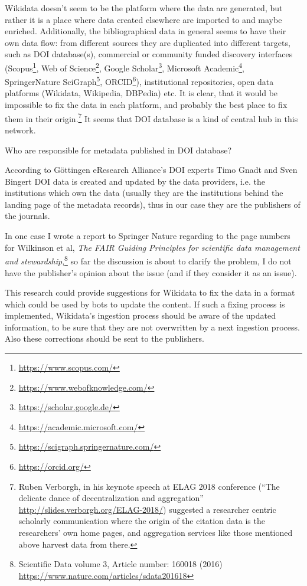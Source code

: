 Wikidata doesn't seem to be the platform where the data are generated, but rather it is a place where data created elsewhere are imported to and maybe enriched. Additionally, the bibliographical data in general seems to have their own data flow: from different sources they are duplicated into different targets, such as DOI database(s), commercial or community funded discovery interfaces (Scopus\footnote{\url{https://www.scopus.com/}}, Web of Science\footnote{\url{https://www.webofknowledge.com/}}, Google Scholar\footnote{\url{https://scholar.google.de/}}, Microsoft Academic\footnote{\url{https://academic.microsoft.com/}}, SpringerNature SciGraph\footnote{\url{https://scigraph.springernature.com/}}, \textsc{ORCID}\footnote{\url{https://orcid.org/}}), institutional repositories, open data platforms (Wikidata, Wikipedia, DBPedia) etc. It is clear, that it would be impossible to fix the data in each platform, and probably the best place to fix them in their origin.\footnote{Ruben Verborgh, in his keynote speech at ELAG 2018 conference (``The delicate dance of decentralization and aggregation'' \url{http://slides.verborgh.org/ELAG-2018/}) suggested a researcher centric scholarly communication where the origin of the citation data is the researchers' own home pages, and aggregation services like those mentioned above harvest data from there.} It seems that DOI database is a kind of central hub in this network.

Who are responsible for metadata published in DOI database?

According to Göttingen eResearch Alliance's DOI experts Timo Gnadt and Sven Bingert DOI data is created and updated by the data providers, i.e. the institutions which own the data (usually they are the institutions behind the landing page of the metadata records), thus in our case they are the publishers of the journals.

In one case I wrote a report to Springer Nature regarding to the page numbers for Wilkinson et al, \emph{The FAIR Guiding Principles for scientific data management and stewardship},\footnote{Scientific Data volume 3, Article number: 160018 (2016) \url{https://www.nature.com/articles/sdata201618}} so far the discussion is about to clarify the problem, I do not have the publisher's opinion about the issue (and if they consider it as an issue).

This research could provide suggestions for Wikidata to fix the data in a format which could be used by bots to update the content. If such a fixing process is implemented, Wikidata's ingestion process should be aware of the updated information, to be sure that they are not overwritten by a next ingestion process. Also these corrections should be sent to the publishers.

